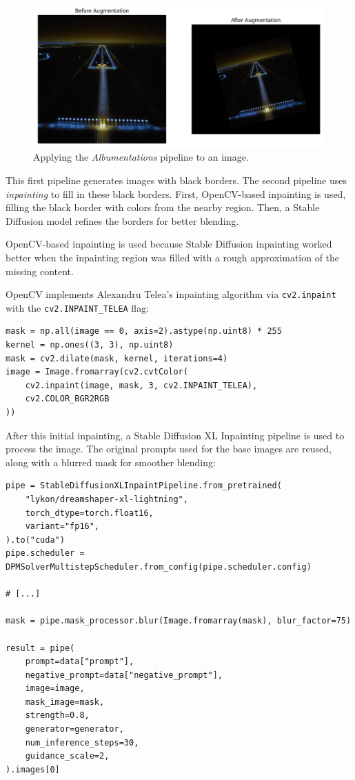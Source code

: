 \begin{figure}[htbp]
\centering
\includegraphics[width=1.0\textwidth]{figures/albumentations.png}
  \caption{Applying the \emph{Albumentations} pipeline to an image.}
\label{fig:noise_to_image}
\end{figure}

This first pipeline generates images with black borders. 
The second pipeline uses \emph{inpainting} to fill in these black borders. 
First, OpenCV-based inpainting is used, filling the black border with colors from the nearby region. 
Then, a Stable Diffusion model refines the borders for better blending.

OpenCV-based inpainting is used because Stable Diffusion inpainting worked
better when the inpainting region was filled with a rough approximation of the
missing content.

OpenCV implements Alexandru Telea's inpainting algorithm \cite{telea_image_2004}
via \texttt{cv2.inpaint} with the \texttt{cv2.INPAINT\_TELEA} flag:

\begin{lstlisting}
mask = np.all(image == 0, axis=2).astype(np.uint8) * 255
kernel = np.ones((3, 3), np.uint8)
mask = cv2.dilate(mask, kernel, iterations=4)
image = Image.fromarray(cv2.cvtColor(
    cv2.inpaint(image, mask, 3, cv2.INPAINT_TELEA),
    cv2.COLOR_BGR2RGB
))
\end{lstlisting}

After this initial inpainting, a Stable Diffusion XL Inpainting pipeline is used to process the image. 
The original prompts used for the base images are reused, along with a blurred mask for smoother blending:

\begin{lstlisting}
pipe = StableDiffusionXLInpaintPipeline.from_pretrained(
    "lykon/dreamshaper-xl-lightning",
    torch_dtype=torch.float16,
    variant="fp16",
).to("cuda")
pipe.scheduler = DPMSolverMultistepScheduler.from_config(pipe.scheduler.config)

# [...]

mask = pipe.mask_processor.blur(Image.fromarray(mask), blur_factor=75)

result = pipe(
    prompt=data["prompt"],
    negative_prompt=data["negative_prompt"],
    image=image,
    mask_image=mask,
    strength=0.8,
    generator=generator,
    num_inference_steps=30,
    guidance_scale=2,
).images[0]
\end{lstlisting}

